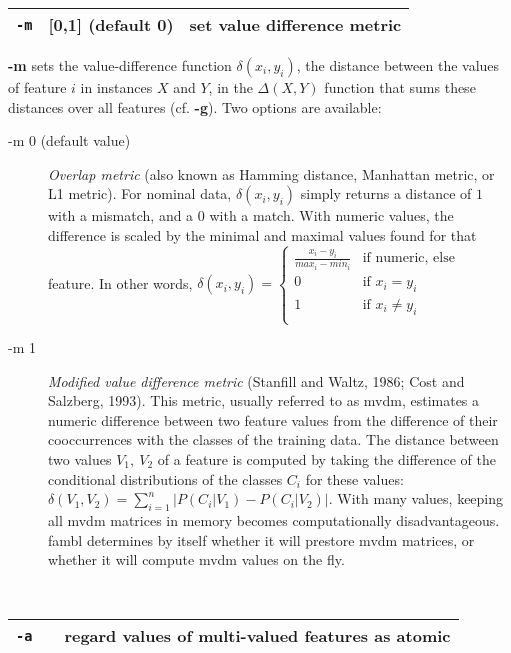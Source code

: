 \documentclass[11pt]{article}
\begin{document}
\begin{tabular}{|p{}|p{}|p{}|}
\hline
{\tt -m} & [0,1] (default 0) & set value difference metric \\
\hline
\end{tabular}

{\bf -m} sets the value-difference function $\delta(x_{i},y_{i})$, the
distance between the values of feature $i$ in instances $X$ and $Y$,
in the $\Delta(X,Y)$ function that sums these distances over all
features (cf. {\bf -g}). Two options are available:

\begin{description}
\item[-m 0 (default value)] {\em Overlap metric} (also known as
Hamming distance, Manhattan metric, or L1 metric). For nominal data,
$\delta(x_{i}, y_{i})$ simply returns a distance of $1$ with a
mismatch, and a $0$ with a match. With numeric values, the difference
is scaled by the minimal and maximal values found for that
feature. In other words,
\begin{math}
\delta(x_{i}, y_{i}) = \left\{ \begin{array}{ll}
\frac{x_{i}-y_{i}}{max_{i}-min_{i}} & \mbox{if numeric, else}\\ 0 &
\mbox{if $x_{i} = y_{i}$}\\ 1 & \mbox{if $x_{i} \neq y_{i}$}\\
\end{array} \right.
\end{math}
\item[-m 1] {\em Modified value difference metric} (Stanfill and
Waltz, 1986; Cost and Salzberg, 1993).  This metric, usually referred
to as {\sc mvdm}, estimates a numeric difference between two feature
values from the difference of their cooccurrences with the classes of
the training data. The distance between two values $V_{1},\ V_{2}$ of
a feature is computed by taking the difference of the conditional
distributions of the classes $C_{i}$ for these values: $\delta(V_{1},
V_{2}) = \sum_{i=1}^{n} \left| P(C_{i}|V_{1}) - P(C_{i}|V_{2})
\right|$. With many values, keeping all {\sc mvdm} matrices in memory
becomes computationally disadvantageous. {\sc fambl} determines by
itself whether it will prestore {\sc mvdm} matrices, or whether it
will compute {\sc mvdm} values on the fly.
\end{description}
\ \\

\begin{tabular}{|p{}|p{}|p{}|}
\hline
{\tt -a} & & regard values of multi-valued features as atomic \\
\hline
\end{tabular}
\end{document}
